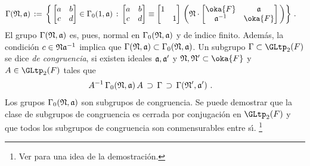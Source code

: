 \begin{align*}
	\Gamma(\frak{N},\frak{a}) & \,:=\,
		\bigg\{\begin{bmatrix} a & b \\ c & d \end{bmatrix}\in
			\Gamma_{0}(1,\frak{a})\,:\,
		\begin{bmatrix} a & b \\ c & d \end{bmatrix}
			\equiv
			\begin{bmatrix} 1 & \\ & 1 \end{bmatrix}\,
				\bigg(\frak{N}\cdot
				\begin{bmatrix} \oka{F} & \frak{a} \\
				\frak{a}^{-1} & \oka{F} \end{bmatrix}
				\bigg)
			\bigg\}%
	\text{ .}
\end{align*}
%
El grupo $\Gamma(\frak{N},\frak{a})$ es, pues, normal en
$\Gamma_{0}(\frak{N},\frak{a})$ y de \'{\i}ndice finito. Adem\'{a}s, la
condici\'{o}n $c\in\frak{N}\frak{a}^{-1}$ implica que
$\Gamma(\frak{N},\frak{a})\subset\Gamma_{0}(\frak{N},\frak{a})$. Un subgrupo
$\Gamma\subset\GLtp_{2}(F)$ se dice \emph{de congruencia}, si
existen ideales $\frak{a},\frak{a}'$ y $\frak{N},\frak{N}'\subset\oka{F}$ y
$A\in\GLtp_{2}(F)$ tales que
\begin{align*}
	A^{-1}\,\Gamma_{0}(\frak{N},\frak{a})\,A & \,\supset\,
		\Gamma \,\supset\,
		\Gamma(\frak{N}',\frak{a}')
	\text{ .}
\end{align*}
%
Los grupos $\Gamma_{0}(\frak{N},\frak{a})$ son subgrupos de congruencia. Se
puede demostrar que la clase de subgrupos de congruencia es cerrada por
conjugaci\'{o}n en $\GLtp_{2}(F)$ y que todos los subgrupos de congruencia son
conmensurables entre s\'{\i}.%
\footnote{
	Ver \cite{Freitag} para una idea de la demostraci\'{o}n.
}

